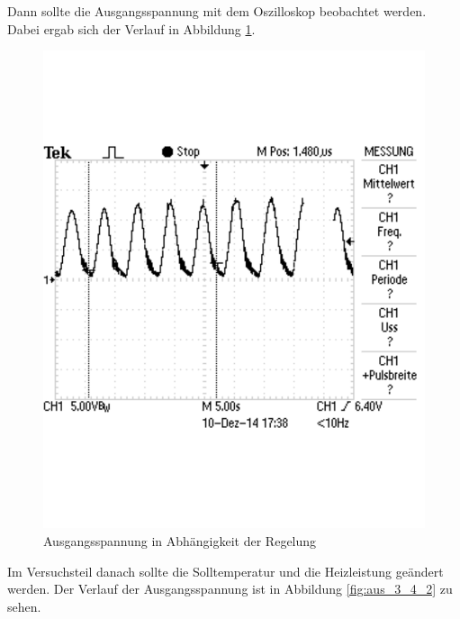\documentclass[12pt,a4paper]{article}
\begin{document}
Dann sollte die Ausgangsspannung mit dem Oszilloskop beobachtet werden. Dabei ergab sich der Verlauf in Abbildung \ref{fig:aus_3_4_1}.


\begin{figure}[H] 
  \centering
    \includegraphics[trim = 0mm 50mm 0mm 50mm, clip, scale = 0.6]{TEK0007.pdf}
  	\caption[Ausgangsspannung in Abhängigkeit der Regelung]{Ausgangsspannung in Abhängigkeit der Regelung}
  \label{fig:aus_3_4_1}
\end{figure}

Im Versuchsteil danach sollte die Solltemperatur und die Heizleistung geändert werden. Der Verlauf der Ausgangsspannung ist in Abbildung \ref{fig:aus_3_4_2} zu sehen.
\end{document}
